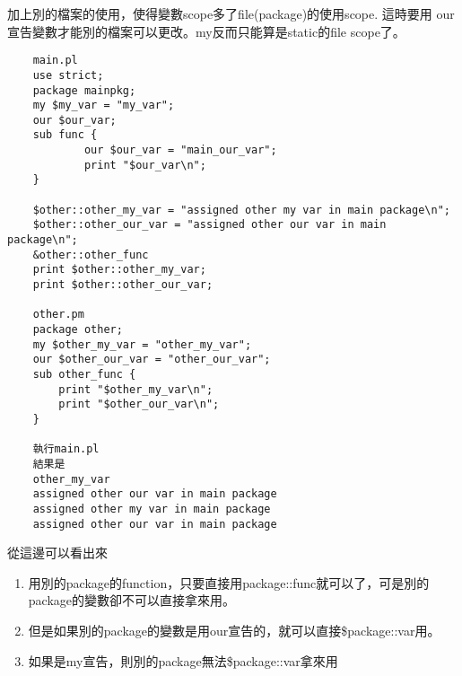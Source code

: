     加上別的檔案的使用，使得變數scope多了file(package)的使用scope. 這時要用
    our宣告變數才能別的檔案可以更改。my反而只能算是static的file scope了。
    \begin{verbatim}
    main.pl
    use strict;
    package mainpkg;
    my $my_var = "my_var";
    our $our_var;
    sub func {
            our $our_var = "main_our_var";
            print "$our_var\n";
    }

    $other::other_my_var = "assigned other my var in main package\n";
    $other::other_our_var = "assigned other our var in main package\n";
    &other::other_func
    print $other::other_my_var;
    print $other::other_our_var;

    other.pm
    package other;
    my $other_my_var = "other_my_var";
    our $other_our_var = "other_our_var";
    sub other_func {
        print "$other_my_var\n";
        print "$other_our_var\n";
    }

    執行main.pl
    結果是
    other_my_var
    assigned other our var in main package
    assigned other my var in main package
    assigned other our var in main package

    \end{verbatim}
    從這邊可以看出來
    \begin{enumerate}
    \item   用別的package的function，只要直接用package::func就可以了，可是別的
	    package的變數卻不可以直接拿來用。
    \item   但是如果別的package的變數是用our宣告的，就可以直接\$package::var用。
    \item   如果是my宣告，則別的package無法\$package::var拿來用
    \end{enumerate}
